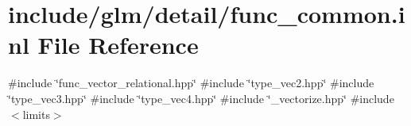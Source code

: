 \hypertarget{func__common_8inl}{}\section{include/glm/detail/func\+\_\+common.inl File Reference}
\label{func__common_8inl}
{\ttfamily \#include \char`\"{}func\+\_\+vector\+\_\+relational.\+hpp\char`\"{}}\newline
{\ttfamily \#include \char`\"{}type\+\_\+vec2.\+hpp\char`\"{}}\newline
{\ttfamily \#include \char`\"{}type\+\_\+vec3.\+hpp\char`\"{}}\newline
{\ttfamily \#include \char`\"{}type\+\_\+vec4.\+hpp\char`\"{}}\newline
{\ttfamily \#include \char`\"{}\+\_\+vectorize.\+hpp\char`\"{}}\newline
{\ttfamily \#include $<$limits$>$}\newline
